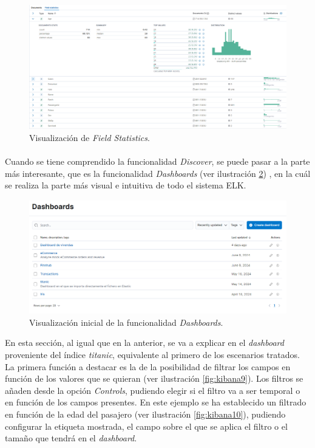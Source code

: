 \begin{figure}
    \centering
    \includegraphics[width=1\linewidth]{img/kibana7.png}
    \caption{Visualización de \textit{Field Statistics}.}
    \label{fig:kibana5}
\end{figure}

\paragraph{}
\paragraph{}

Cuando se tiene comprendido la funcionalidad \textit{Discover}, se puede pasar a la parte más interesante, que es la funcionalidad \textit{Dashboards} (ver ilustración  \ref{fig:kibana8}) , en la cuál se realiza la parte más visual e intuitiva de todo el sistema ELK.

\begin{figure}
    \centering
    \includegraphics[width=1\linewidth]{img/kibana8.png}
    \caption{Visualización inicial de la funcionalidad \textit{Dashboards}.}
    \label{fig:kibana8}
\end{figure}

En esta sección, al igual que en la anterior, se va a explicar en el \textit{dashboard} proveniente del índice \textit{titanic}, equivalente al primero de los escenarios tratados.
La primera función a destacar es la de la posibilidad de filtrar los campos en función de los valores que se quieran (ver ilustración  \ref{fig:kibana9}). Los filtros se añaden desde la opción \textit{Controls}, pudiendo elegir si el filtro va a ser temporal o en función de los campos presentes. En este ejemplo se ha establecido un filtrado en función de la edad del pasajero (ver ilustración  \ref{fig:kibana10}), pudiendo configurar la etiqueta mostrada, el campo sobre el que se aplica el filtro o el tamaño que tendrá en el \textit{dashboard}.

